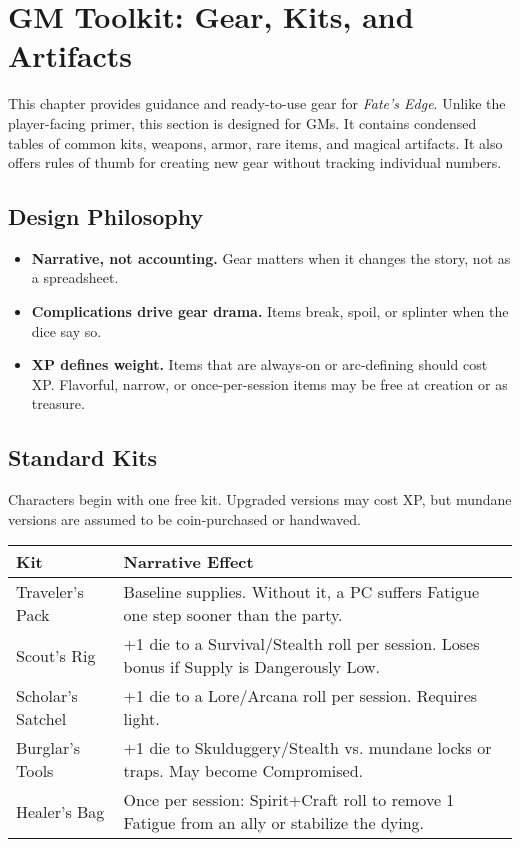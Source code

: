 \documentclass[12pt]{book}
\begin{document}
\chapter{GM Toolkit: Gear, Kits, and Artifacts}

This chapter provides guidance and ready-to-use gear for \textit{Fate’s Edge}.  
Unlike the player-facing primer, this section is designed for GMs.  
It contains condensed tables of common kits, weapons, armor, rare items, and magical artifacts.  
It also offers rules of thumb for creating new gear without tracking individual numbers.

\section{Design Philosophy}
\begin{itemize}
  \item \textbf{Narrative, not accounting.} Gear matters when it changes the story, not as a spreadsheet.
  \item \textbf{Complications drive gear drama.} Items break, spoil, or splinter when the dice say so.
  \item \textbf{XP defines weight.} Items that are always-on or arc-defining should cost XP.  
  Flavorful, narrow, or once-per-session items may be free at creation or as treasure.
\end{itemize}

\section{Standard Kits}
Characters begin with one free kit. Upgraded versions may cost XP, but mundane versions are assumed to be coin-purchased or handwaved.

\begin{tabularx}{\textwidth}{lX}
\textbf{Kit} & \textbf{Narrative Effect} \\
\hline
Traveler’s Pack & Baseline supplies. Without it, a PC suffers Fatigue one step sooner than the party. \\
Scout’s Rig & +1 die to a Survival/Stealth roll per session. Loses bonus if Supply is Dangerously Low. \\
Scholar’s Satchel & +1 die to a Lore/Arcana roll per session. Requires light. \\
Burglar’s Tools & +1 die to Skulduggery/Stealth vs. mundane locks or traps. May become Compromised. \\
Healer’s Bag & Once per session: Spirit+Craft roll to remove 1 Fatigue from an ally or stabilize the dying. \\
\end{tabularx}
\end{document}
